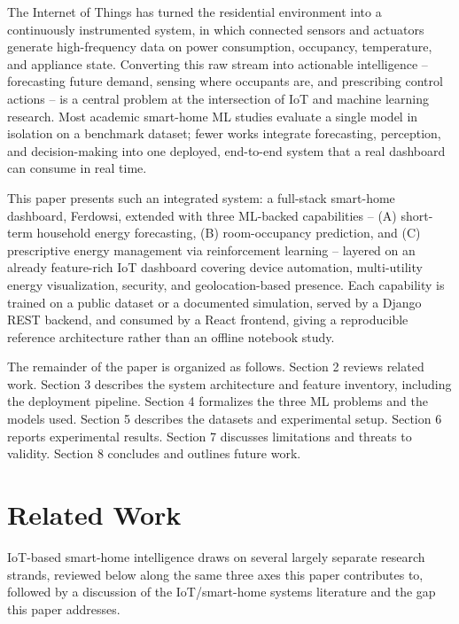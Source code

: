 \documentclass[11pt,a4paper]{article}
\begin{document}
The Internet of Things has turned the residential environment into a continuously instrumented system, in which connected sensors and actuators generate high-frequency data on power consumption, occupancy, temperature, and appliance state. Converting this raw stream into actionable intelligence -- forecasting future demand, sensing where occupants are, and prescribing control actions -- is a central problem at the intersection of IoT and machine learning research. Most academic smart-home ML studies evaluate a single model in isolation on a benchmark dataset; fewer works integrate forecasting, perception, and decision-making into one deployed, end-to-end system that a real dashboard can consume in real time.

This paper presents such an integrated system: a full-stack smart-home dashboard, Ferdowsi, extended with three ML-backed capabilities -- (A) short-term household energy forecasting, (B) room-occupancy prediction, and (C) prescriptive energy management via reinforcement learning -- layered on an already feature-rich IoT dashboard covering device automation, multi-utility energy visualization, security, and geolocation-based presence. Each capability is trained on a public dataset or a documented simulation, served by a Django REST backend, and consumed by a React frontend, giving a reproducible reference architecture rather than an offline notebook study.

The remainder of the paper is organized as follows. Section 2 reviews related work. Section 3 describes the system architecture and feature inventory, including the deployment pipeline. Section 4 formalizes the three ML problems and the models used. Section 5 describes the datasets and experimental setup. Section 6 reports experimental results. Section 7 discusses limitations and threats to validity. Section 8 concludes and outlines future work.

\section{Related Work}

IoT-based smart-home intelligence draws on several largely separate research strands, reviewed below along the same three axes this paper contributes to, followed by a discussion of the IoT/smart-home systems literature and the gap this paper addresses.
\end{document}
